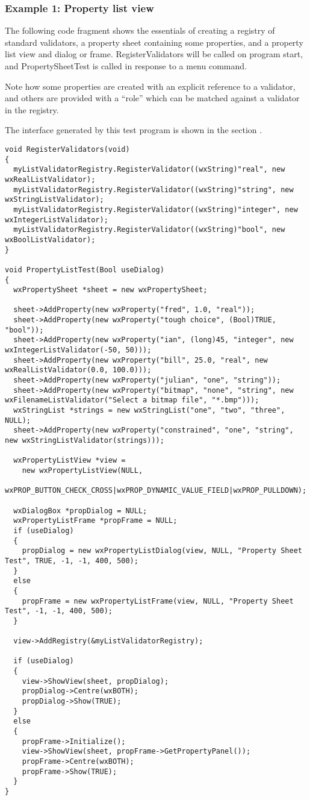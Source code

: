\subsubsection{Example 1: Property list view}

The following code fragment shows the essentials of creating a registry of
standard validators, a property sheet containing some properties, and
a property list view and dialog or frame. RegisterValidators will be
called on program start, and PropertySheetTest is called in response to a
menu command.

Note how some properties are created with an explicit reference to
a validator, and others are provided with a ``role'' which can be matched
against a validator in the registry.

The interface generated by this test program is shown in the section .

\begin{verbatim}
void RegisterValidators(void)
{
  myListValidatorRegistry.RegisterValidator((wxString)"real", new wxRealListValidator);
  myListValidatorRegistry.RegisterValidator((wxString)"string", new wxStringListValidator);
  myListValidatorRegistry.RegisterValidator((wxString)"integer", new wxIntegerListValidator);
  myListValidatorRegistry.RegisterValidator((wxString)"bool", new wxBoolListValidator);
}

void PropertyListTest(Bool useDialog)
{
  wxPropertySheet *sheet = new wxPropertySheet;

  sheet->AddProperty(new wxProperty("fred", 1.0, "real"));
  sheet->AddProperty(new wxProperty("tough choice", (Bool)TRUE, "bool"));
  sheet->AddProperty(new wxProperty("ian", (long)45, "integer", new wxIntegerListValidator(-50, 50)));
  sheet->AddProperty(new wxProperty("bill", 25.0, "real", new wxRealListValidator(0.0, 100.0)));
  sheet->AddProperty(new wxProperty("julian", "one", "string"));
  sheet->AddProperty(new wxProperty("bitmap", "none", "string", new wxFilenameListValidator("Select a bitmap file", "*.bmp")));
  wxStringList *strings = new wxStringList("one", "two", "three", NULL);
  sheet->AddProperty(new wxProperty("constrained", "one", "string", new wxStringListValidator(strings)));

  wxPropertyListView *view =
    new wxPropertyListView(NULL,
     wxPROP_BUTTON_CHECK_CROSS|wxPROP_DYNAMIC_VALUE_FIELD|wxPROP_PULLDOWN);

  wxDialogBox *propDialog = NULL;
  wxPropertyListFrame *propFrame = NULL;
  if (useDialog)
  {
    propDialog = new wxPropertyListDialog(view, NULL, "Property Sheet Test", TRUE, -1, -1, 400, 500);
  }
  else
  {
    propFrame = new wxPropertyListFrame(view, NULL, "Property Sheet Test", -1, -1, 400, 500);
  }
  
  view->AddRegistry(&myListValidatorRegistry);

  if (useDialog)
  {
    view->ShowView(sheet, propDialog);
    propDialog->Centre(wxBOTH);
    propDialog->Show(TRUE);
  }
  else
  {
    propFrame->Initialize();
    view->ShowView(sheet, propFrame->GetPropertyPanel());
    propFrame->Centre(wxBOTH);
    propFrame->Show(TRUE);
  }
}
\end{verbatim}

